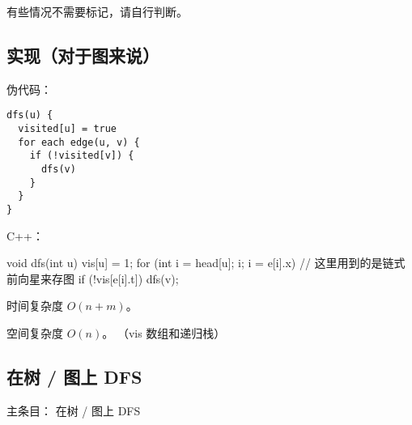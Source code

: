 有些情况不需要标记，请自行判断。

\subsection{实现（对于图来说）}

伪代码：

\begin{verbatim}
dfs(u) {
  visited[u] = true
  for each edge(u, v) {
    if (!visited[v]) {
      dfs(v)
    }
  }
}
\end{verbatim}

C++：

\begin{cppcode}
void dfs(int u) {
  vis[u] = 1;
  for (int i = head[u]; i; i = e[i].x) {
    // 这里用到的是链式前向星来存图
    if (!vis[e[i].t]) {
      dfs(v);
    }
  }
}
\end{cppcode}

时间复杂度 $O(n + m)$。

空间复杂度 $O(n)$。 （vis 数组和递归栈）

\subsection{在树 / 图上 DFS}

主条目： 在树 / 图上 DFS 
